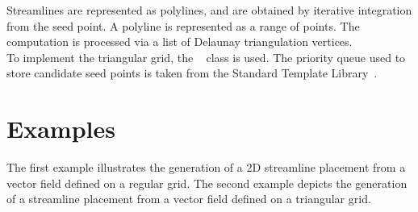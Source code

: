Streamlines are represented as polylines, and are obtained by
iterative integration from the seed point. A polyline is represented as a range of points. The computation is
processed via a list of Delaunay triangulation vertices.\\

To implement the triangular grid, the \cgal\
 class is used. The priority queue used
to store candidate seed points is taken from the Standard Template
Library~\cite{cgal:sgcsi-stlpg-97}.

\section{Examples\label{Section_2D_Streamlines_Example}}

The first example illustrates the generation of a 2D streamline
placement from a vector field defined on a regular grid.
The second example depicts the generation of a streamline placement from a vector
field defined on a triangular grid.
